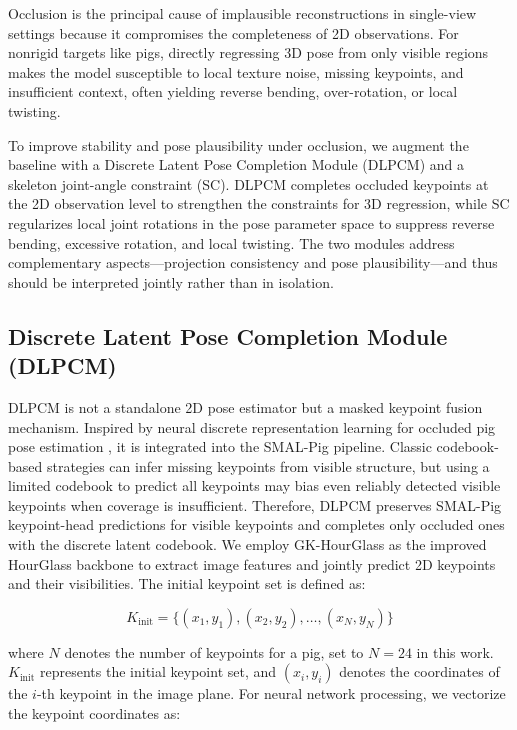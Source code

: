 \documentclass[computers,article,submit,pdftex,moreauthors]{Definitions/mdpi}
\begin{document}
Occlusion is the principal cause of implausible reconstructions in single-view settings because it compromises the completeness of 2D observations. For nonrigid targets like pigs, directly regressing 3D pose from only visible regions makes the model susceptible to local texture noise, missing keypoints, and insufficient context, often yielding reverse bending, over-rotation, or local twisting.

To improve stability and pose plausibility under occlusion, we augment the baseline with a Discrete Latent Pose Completion Module (DLPCM) and a skeleton joint-angle constraint (SC). DLPCM completes occluded keypoints at the 2D observation level to strengthen the constraints for 3D regression, while SC regularizes local joint rotations in the pose parameter space to suppress reverse bending, excessive rotation, and local twisting. The two modules address complementary aspects---projection consistency and pose plausibility---and thus should be interpreted jointly rather than in isolation.

\subsection{Discrete Latent Pose Completion Module (DLPCM)}\label{sec:dlpcm}

DLPCM is not a standalone 2D pose estimator but a masked keypoint fusion mechanism. Inspired by neural discrete representation learning for occluded pig pose estimation \cite{ref28}, it is integrated into the SMAL-Pig pipeline. Classic codebook-based strategies can infer missing keypoints from visible structure, but using a limited codebook to predict all keypoints may bias even reliably detected visible keypoints when coverage is insufficient. Therefore, DLPCM preserves SMAL-Pig keypoint-head predictions for visible keypoints and completes only occluded ones with the discrete latent codebook. We employ GK-HourGlass as the improved HourGlass backbone to extract image features and jointly predict 2D keypoints and their visibilities. The initial keypoint set is defined as:

\begin{equation}
K_{\text{init}} = \{(x_1, y_1), (x_2, y_2), \ldots, (x_N, y_N)\}
\end{equation}

where $N$ denotes the number of keypoints for a pig, set to $N = 24$ in this work. $K_{\text{init}}$ represents the initial keypoint set, and $(x_i, y_i)$ denotes the coordinates of the $i$-th keypoint in the image plane. For neural network processing, we vectorize the keypoint coordinates as:
\end{document}
